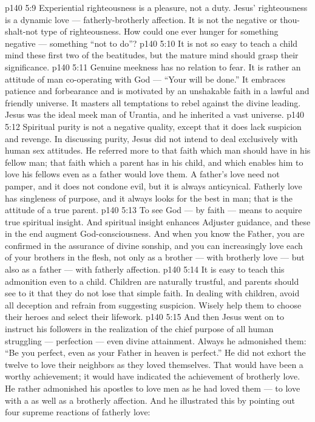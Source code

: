 \vs p140 5:9 Experiential righteousness is a pleasure, not a duty. Jesus’ righteousness is a dynamic love --- fatherly\hyp{}brotherly affection. It is not the negative or thou\hyp{}shalt\hyp{}not type of righteousness. How could one ever hunger for something negative --- something “not to do”?
\vs p140 5:10 \pc It is not so easy to teach a child mind these first two of the beatitudes, but the mature mind should grasp their significance.
\vs p140 5:11 \pc {}\bibnobreakspace {} Genuine meekness has no relation to fear. It is rather an attitude of man co\hyp{}operating with God --- “Your will be done.” It embraces patience and forbearance and is motivated by an unshakable faith in a lawful and friendly universe. It masters all temptations to rebel against the divine leading. Jesus was the ideal meek man of Urantia, and he inherited a vast universe.
\vs p140 5:12 \pc {}\bibnobreakspace {} Spiritual purity is not a negative quality, except that it does lack suspicion and revenge. In discussing purity, Jesus did not intend to deal exclusively with human sex attitudes. He referred more to that faith which man should have in his fellow man; that faith which a parent has in his child, and which enables him to love his fellows even as a father would love them. A father’s love need not pamper, and it does not condone evil, but it is always anticynical. Fatherly love has singleness of purpose, and it always looks for the best in man; that is the attitude of a true parent.
\vs p140 5:13 To see God --- by faith --- means to acquire true spiritual insight. And spiritual insight enhances Adjuster guidance, and these in the end augment God\hyp{}consciousness. And when you know the Father, you are confirmed in the assurance of divine sonship, and you can increasingly love each of your brothers in the flesh, not only as a brother --- with brotherly love --- but also as a father --- with fatherly affection.
\vs p140 5:14 It is easy to teach this admonition even to a child. Children are naturally trustful, and parents should see to it that they do not lose that simple faith. In dealing with children, avoid all deception and refrain from suggesting suspicion. Wisely help them to choose their heroes and select their lifework.
\vs p140 5:15 \pc And then Jesus went on to instruct his followers in the realization of the chief purpose of all human struggling --- perfection --- even divine attainment. Always he admonished them: \textcolor{ubdarkred}{“Be you perfect, even as your Father in heaven is perfect.”} He did not exhort the twelve to love their neighbors as they loved themselves. That would have been a worthy achievement; it would have indicated the achievement of brotherly love. He rather admonished his apostles to love men as he had loved them --- to love with a  as well as a brotherly affection. And he illustrated this by pointing out four supreme reactions of fatherly love:
